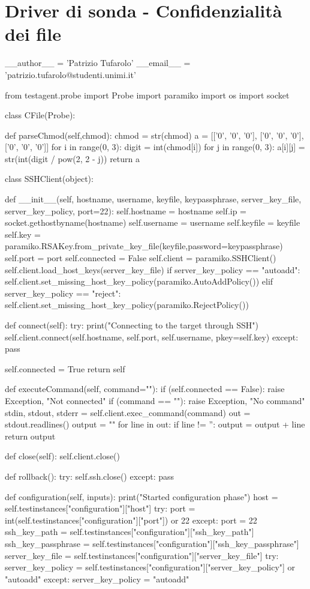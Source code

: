 \chapter{Driver di sonda - Confidenzialità dei file}
\begin{python}
__author__ = 'Patrizio Tufarolo'
__email__ = 'patrizio.tufarolo@studenti.unimi.it'

from testagent.probe import Probe
import paramiko
import os
import socket

class CFile(Probe):

	def parseChmod(self,chmod):
		chmod = str(chmod)
		a = [['0', '0', '0'], ['0', '0', '0'], ['0', '0', '0']]
		for i in range(0, 3):
			digit = int(chmod[i])
			for j in range(0, 3):
				a[i][j] = str(int(digit / pow(2, 2 - j)) %
		return a

	class SSHClient(object):

		def __init__(self, hostname, username, keyfile, keypassphrase, server_key_file, server_key_policy, port=22):
			self.hostname = hostname
			self.ip = socket.gethostbyname(hostname)
			self.username = username
			self.keyfile = keyfile
			self.key = paramiko.RSAKey.from_private_key_file(keyfile,password=keypassphrase)
			self.port = port
			self.connected = False
			self.client = paramiko.SSHClient()
			self.client.load_host_keys(server_key_file)
			if server_key_policy == "autoadd":
				self.client.set_missing_host_key_policy(paramiko.AutoAddPolicy())
			elif server_key_policy == "reject":
				self.client.set_missing_host_key_policy(paramiko.RejectPolicy())

		def connect(self):
			try:
				print("Connecting to the target through SSH")
				self.client.connect(self.hostname, self.port, self.username, pkey=self.key)
			except:
				pass

			self.connected = True
			return self

		def executeCommand(self, command=""):
			if (self.connected == False):
				raise Exception, "Not connected"
			if (command == ""):
				raise Exception, "No command"
			stdin, stdout, stderr = self.client.exec_command(command)
			out = stdout.readlines()
			output = ""
			for line in out:
				if line != '':
					output = output + line
			return output

		def close(self):
			self.client.close()

	def rollback():
		try:
			self.ssh.close()
		except:
			pass

	def configuration(self, inputs):
		print("Started configuration phase")
		host = self.testinstances["configuration"]["host"]
		try:
			port = int(self.testinstances["configuration"]["port"]) or 22
		except:
			port = 22
		ssh_key_path = self.testinstances["configuration"]["ssh_key_path"]
		ssh_key_passphrase = self.testinstances["configuration"]["ssh_key_passphrase"]
		server_key_file = self.testinstances["configuration"]["server_key_file"]
		try:
			server_key_policy = self.testinstances["configuration"]["server_key_policy"] or "autoadd"
		except:
			server_key_policy = "autoadd"


\end{python}
